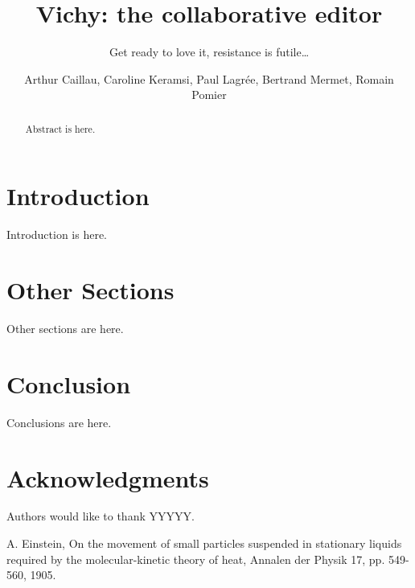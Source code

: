 \documentclass{llncs}
\begin{document}
\title{Vichy: the collaborative editor}
\subtitle{Get ready to love it, resistance is futile\ldots}

\author{Arthur Caillau, Caroline Keramsi, Paul Lagrée, Bertrand Mermet, Romain Pomier}

\maketitle

\begin{abstract}

Abstract is here.

\end{abstract}

\section{Introduction}\label{sec:Introduction}

Introduction is here.

\section{Other Sections}\label{sec:Others}

Other sections are here. 


\section{Conclusion}\label{sec:Conclusion}

Conclusions are here.

\section*{Acknowledgments}\label{sec:Acknowledgments}

Authors would like to thank YYYYY.

\begin{thebibliography}{1}

A. Einstein, On the movement of small particles suspended in stationary liquids required by the molecular-kinetic theory of heat, Annalen der Physik 17, pp. 549-560, 1905.

\end{thebibliography}
\end{document}
